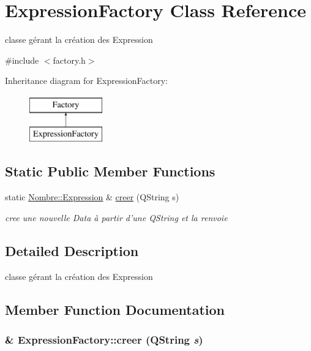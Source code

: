 \hypertarget{classExpressionFactory}{
\section{ExpressionFactory Class Reference}
\label{classExpressionFactory}
}


classe gérant la création des Expression  




{\ttfamily \#include $<$factory.h$>$}

Inheritance diagram for ExpressionFactory:\begin{figure}[H]
\begin{center}
\leavevmode
\includegraphics[height=2cm]{classExpressionFactory}
\end{center}
\end{figure}
\subsection*{Static Public Member Functions}
\begin{DoxyCompactItemize}
\item 
static \hyperlink{classNombre_1_1Expression}{Nombre::Expression} \& \hyperlink{classExpressionFactory_a4df557fb77406bbfc1dc28a0fb830204}{creer} (QString s)
\begin{DoxyCompactList}\small\item\em cree une nouvelle Data à partir d'une QString et la renvoie \item\end{DoxyCompactList}\end{DoxyCompactItemize}


\subsection{Detailed Description}
classe gérant la création des Expression 

\subsection{Member Function Documentation}
\hypertarget{classExpressionFactory_a4df557fb77406bbfc1dc28a0fb830204}{
\subsubsection[{creer}]{ \& ExpressionFactory::creer (QString {\em s})}}
\label{classExpressionFactory_a4df557fb77406bbfc1dc28a0fb830204}


